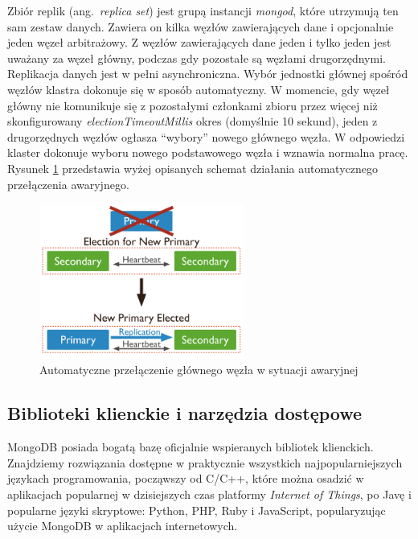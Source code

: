 Zbiór replik (ang.~\textit{replica set}) jest grupą instancji \textit{mongod}, które utrzymują ten sam zestaw danych.
Zawiera on kilka węzłów zawierających dane i opcjonalnie jeden węzeł arbitrażowy.
Z węzłów zawierających dane jeden i tylko jeden jest uważany za węzeł główny, podczas gdy pozostałe są węzłami drugorzędnymi.
Replikacja danych jest w pełni asynchroniczna.
Wybór jednostki głównej spośród węzłów klastra dokonuje się w sposób automatyczny.
W momencie, gdy węzeł główny nie komunikuje się z pozostałymi członkami zbioru przez więcej niż skonfigurowany \textit{electionTimeoutMillis} okres (domyślnie 10 sekund), jeden z drugorzędnych węzłów ogłasza \enquote{wybory} nowego głównego węzła.
W odpowiedzi klaster dokonuje wyboru nowego podstawowego węzła i wznawia normalna pracę. Rysunek \ref{fig:mongoAutoFailover} przedstawia wyżej opisanych schemat działania automatycznego przełączenia awaryjnego.

\begin{figure}[!ht]
\centering
\includegraphics[width=0.6\textwidth]{figures/replica-set-trigger-election.png}
\caption{Automatyczne przełączenie głównego węzła w sytuacji awaryjnej \cite{MongoDBReplication}}
\label{fig:mongoAutoFailover}
\end{figure}

\subsection{Biblioteki klienckie i narzędzia dostępowe}

MongoDB posiada bogatą bazę oficjalnie wspieranych bibliotek klienckich.
Znajdziemy rozwiązania dostępne w praktycznie wszystkich najpopularniejszych językach programowania, począwszy od C/C++, które można osadzić w aplikacjach popularnej w dzisiejszych czas platformy \textit{Internet of Things}, po Javę i popularne języki skryptowe: Python, PHP, Ruby i JavaScript, popularyzując użycie MongoDB w aplikacjach internetowych.


